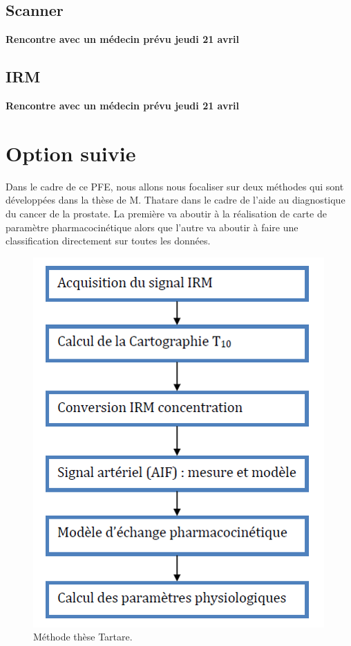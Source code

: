 \section{Scanner}

\textbf{Rencontre avec un médecin prévu jeudi 21 avril}

\section{IRM}

\textbf{Rencontre avec un médecin prévu jeudi 21 avril}


\chapter{Option suivie}


Dans le cadre de ce PFE, nous allons nous focaliser sur deux méthodes qui sont développées dans la thèse de M. Thatare \cite{tartare2014contribution} dans le cadre de l'aide au diagnostique du cancer de la prostate. La première va aboutir à la réalisation de carte de paramètre pharmacocinétique alors que l'autre va aboutir à faire une classification directement sur toutes les données.

\begin{figure}[H]
\centering
    \includegraphics[scale=0.70,angle=0]{Images/MethodeTheseTartare.png}
    \caption{Méthode thèse Tartare.}
    \label{fig:MethodeTheseTartare}
\end{figure}

